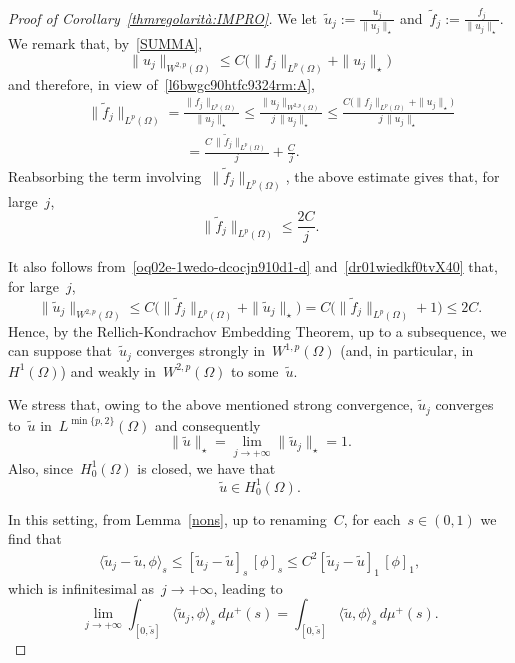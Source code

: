 \documentclass[12pt,a4paper,intlimits,sumlimits]{amsart}
\theoremstyle{definition}
\theoremstyle{plain}
\numberwithin{equation}{section}
\renewcommand{\leq}{\leqslant}
\renewcommand{\le}{\leqslant}
\begin{document}
\begin{appendix}
\begin{proof}[Proof of Corollary~\ref{thmregolarità:IMPRO}]
We let~$\widetilde u_j:=\frac{u_j}{\|u_j\|_\star}$ and~$\widetilde f_j:=\frac{f_j}{\|u_j\|_\star}$.
We remark that, by~\eqref{SUMMA},
\begin{equation}\label{oq02e-1wedo-dcocjn910d1-d} \| u_j\|_{W^{2,p}(\Omega)}\leq 
C\Big(\| f_j\|_{L^p(\Omega)}+\| u_j\|_\star\Big)
\end{equation}
and therefore, in view of~\eqref{l6bwgc90htfc9324rm:A},
\begin{eqnarray*}&&\| \widetilde f_j\|_{L^p(\Omega)}=\frac{\|f_j\|_{L^p(\Omega)}}{\|u_j\|_\star}
\le\frac{\|u_j\|_{W^{2,p}(\Omega)}}{j\,\|u_j\|_\star}
\le \frac{C\Big(\| f_j\|_{L^p(\Omega)}+\| u_j\|_\star\Big)}{j\,\|u_j\|_\star}
\\&&\quad\qquad\qquad\qquad=\frac{C\,\| \widetilde f_j\|_{L^p(\Omega)}}{j}
+\frac{C}j.
\end{eqnarray*}
Reabsorbing the term involving~$\| \widetilde f_j\|_{L^p(\Omega)}$,
the above estimate gives that, for large~$j$,
\begin{equation}\label{dr01wiedkf0tvX40} \| \widetilde f_j\|_{L^p(\Omega)}\le\frac{2C}j.\end{equation}

It also follows from~\eqref{oq02e-1wedo-dcocjn910d1-d} and~\eqref{dr01wiedkf0tvX40}
that, for large~$j$,
$$\|\widetilde u_j\|_{W^{2,p}(\Omega)}\leq 
C\Big(\|\widetilde f_j\|_{L^p(\Omega)}+\|\widetilde u_j\|_\star\Big)
=C\Big(\|\widetilde f_j\|_{L^p(\Omega)}+1\Big)\le 2C.$$
Hence, by the Rellich-Kondrachov Embedding Theorem,
up to a subsequence, we can suppose that~$\widetilde u_j$ converges strongly
in~$W^{1,p}(\Omega)$ (and, in particular, in~$H^1(\Omega)$)
and weakly in~$W^{2,p}(\Omega)$ to some~$
\widetilde u$.

We stress that, owing to the above mentioned strong convergence, $\widetilde u_j$ converges to~$\widetilde u$
in~${L^{\min\{p,2\}}(\Omega)}$ and consequently
\begin{equation}\label{CLSO.9}\| \widetilde u\|_\star=\lim_{j\to+\infty}\| \widetilde u_j\|_\star=1.\end{equation}
Also, since~$H^1_0(\Omega)$ is closed, we have that
\begin{equation}\label{CLSO}\widetilde u\in H^1_0(\Omega).\end{equation}

In this setting, 
from Lemma~\ref{nons}, up to renaming~$C$, for each~$s\in(0,1)$ we find that
\begin{eqnarray*}
\langle\widetilde u_j-\widetilde u,\phi\rangle_s\le [\widetilde u_j-\widetilde u]_s\,[\phi]_s 
\le C^2 [\widetilde u_j-\widetilde u]_1\,[\phi]_1,
\end{eqnarray*}
which is infinitesimal as~$j\to+\infty$, leading to
$$ \lim_{j\to+\infty}\int_{[0,\widetilde s]}\langle \widetilde u_j,\phi\rangle_s\,d\mu^+(s)=\int_{[0,\widetilde s]}\langle \widetilde u,\phi\rangle_s\,d\mu^+(s).$$


\end{proof}
\end{appendix}
\end{document}
